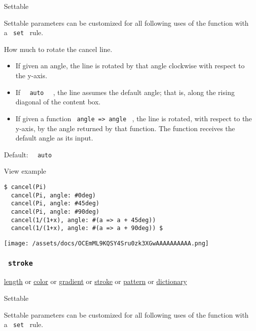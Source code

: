 {{ Settable }}

\label{parameters-angle-settable-tooltip}
Settable parameters can be customized for all following uses of the
function with a \texttt{\ set\ } rule.

How much to rotate the cancel line.

\begin{itemize}
\tightlist
\item
  If given an angle, the line is rotated by that angle clockwise with
  respect to the y-axis.
\item
  If \texttt{\ }{\texttt{\ auto\ }}\texttt{\ } , the line assumes the
  default angle; that is, along the rising diagonal of the content box.
\item
  If given a function \texttt{\ angle\ =\textgreater{}\ angle\ } , the
  line is rotated, with respect to the y-axis, by the angle returned by
  that function. The function receives the default angle as its input.
\end{itemize}

Default: \texttt{\ }{\texttt{\ auto\ }}\texttt{\ }


View example

\begin{verbatim}
$ cancel(Pi)
  cancel(Pi, angle: #0deg)
  cancel(Pi, angle: #45deg)
  cancel(Pi, angle: #90deg)
  cancel(1/(1+x), angle: #(a => a + 45deg))
  cancel(1/(1+x), angle: #(a => a + 90deg)) $
\end{verbatim}

\texttt{[image: /assets/docs/OCEmML9KQSY4Sru0zk3XGwAAAAAAAAAA.png]}

\subsubsection{\texorpdfstring{\texttt{\ stroke\ }}{ stroke }}\label{parameters-stroke}

\href{/docs/reference/layout/length/}{length} {or}
\href{/docs/reference/visualize/color/}{color} {or}
\href{/docs/reference/visualize/gradient/}{gradient} {or}
\href{/docs/reference/visualize/stroke/}{stroke} {or}
\href{/docs/reference/visualize/pattern/}{pattern} {or}
\href{/docs/reference/foundations/dictionary/}{dictionary}

{{ Settable }}

\label{parameters-stroke-settable-tooltip}
Settable parameters can be customized for all following uses of the
function with a \texttt{\ set\ } rule.

